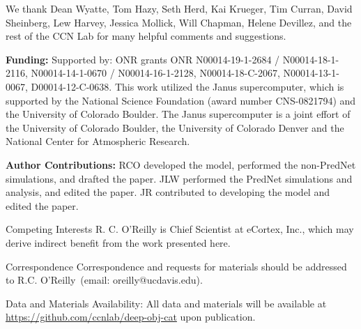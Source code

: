 \documentclass[12pt,twoside]{naturefigs}  %
\newif\myifpdf
\begin{document}


\begin{addendum}
 \item We thank Dean Wyatte, Tom Hazy, Seth Herd, Kai Krueger, Tim Curran, David Sheinberg, Lew Harvey, Jessica Mollick, Will Chapman, Helene Devillez, and the rest of the CCN Lab for many helpful comments and suggestions.

  {\bf Funding:} Supported by: ONR grants ONR N00014-19-1-2684 / N00014-18-1-2116, N00014-14-1-0670 / N00014-16-1-2128, N00014-18-C-2067, N00014-13-1-0067, D00014-12-C-0638.  This work utilized the Janus supercomputer, which is supported by the National Science Foundation (award number CNS-0821794) and the University of Colorado Boulder. The Janus supercomputer is a joint effort of the University of Colorado Boulder, the University of Colorado Denver and the National Center for Atmospheric Research.

 {\bf Author Contributions:} RCO developed the model, performed the non-PredNet simulations, and drafted the paper. JLW performed the PredNet simulations and analysis, and edited the paper.  JR contributed to developing the model and edited the paper.
 \item[Competing Interests] R. C. O'Reilly is Chief Scientist at eCortex, Inc., which may derive indirect benefit from the work presented here.
 \item[Correspondence] Correspondence and requests for materials
should be addressed to R.C. O'Reilly~(email: oreilly@ucdavis.edu).
\item[Data and Materials Availability:]  All data and materials will be available at \url{https://github.com/ccnlab/deep-obj-cat} upon publication.
\end{addendum}

% 
% 
% 
\end{document}
